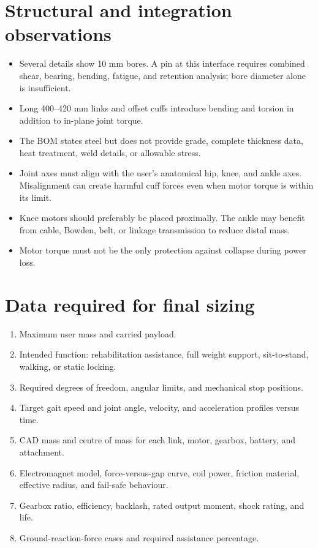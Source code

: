 \documentclass[11pt,a4paper]{article}
\begin{document}
\section{Structural and integration observations}

\begin{itemize}
  \item Several details show 10 mm bores. A pin at this interface requires combined shear, bearing, bending, fatigue, and retention analysis; bore diameter alone is insufficient.
  \item Long 400--420 mm links and offset cuffs introduce bending and torsion in addition to in-plane joint torque.
  \item The BOM states steel but does not provide grade, complete thickness data, heat treatment, weld details, or allowable stress.
  \item Joint axes must align with the user's anatomical hip, knee, and ankle axes. Misalignment can create harmful cuff forces even when motor torque is within its limit.
  \item Knee motors should preferably be placed proximally. The ankle may benefit from cable, Bowden, belt, or linkage transmission to reduce distal mass.
  \item Motor torque must not be the only protection against collapse during power loss.
\end{itemize}

\clearpage
\section{Data required for final sizing}

\begin{enumerate}
  \item Maximum user mass and carried payload.
  \item Intended function: rehabilitation assistance, full weight support, sit-to-stand, walking, or static locking.
  \item Required degrees of freedom, angular limits, and mechanical stop positions.
  \item Target gait speed and joint angle, velocity, and acceleration profiles versus time.
  \item CAD mass and centre of mass for each link, motor, gearbox, battery, and attachment.
  \item Electromagnet model, force-versus-gap curve, coil power, friction material, effective radius, and fail-safe behaviour.
  \item Gearbox ratio, efficiency, backlash, rated output moment, shock rating, and life.
  \item Ground-reaction-force cases and required assistance percentage.
\end{enumerate}
\end{document}
